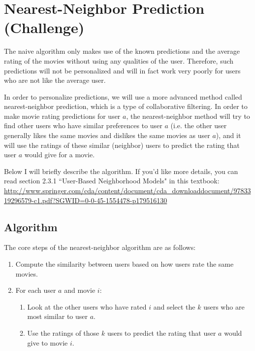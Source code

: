 \documentclass{article}
\begin{document}
\section{Nearest-Neighbor Prediction (Challenge)} \label{nn}

The naive algorithm only makes use of the known predictions and the average rating of the movies without using any qualities of the user. Therefore, such predictions will not be personalized and will in fact work very poorly for users who are not like the average user.

In order to personalize predictions, we will use a more advanced method called nearest-neighbor prediction, which is a type of collaborative filtering. In order to make movie rating predictions for user $a$, the nearest-neighbor method will try to find other users who have similar preferences to user $a$ (i.e. the other user generally likes the same movies and dislikes the same movies as user $a$), and it will use the ratings of these similar (neighbor) users to predict the rating that user $a$ would give for a movie.

Below I will briefly describe the algorithm. If you'd like more details, you can read section 2.3.1 ``User-Based Neighborhood Models" in this textbook: \url{http://www.springer.com/cda/content/document/cda_downloaddocument/9783319296579-c1.pdf?SGWID=0-0-45-1554478-p179516130}

\subsection{Algorithm}

The core steps of the nearest-neighbor algorithm are as follows:

\begin{enumerate}
    \item Compute the similarity between users based on how users rate the same movies.
    
    \item For each user $a$ and movie $i$:
    
    \begin{enumerate}
        \item Look at the other users who have rated $i$ and select the $k$ users who are most similar to user $a$.
        
        \item Use the ratings of those $k$ users to predict the rating that user $a$ would give to movie $i$.
    \end{enumerate}
\end{enumerate}
\end{document}
